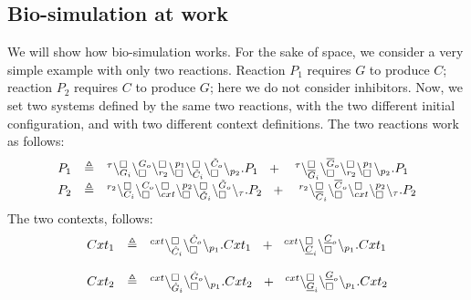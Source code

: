 \subsection{Bio-simulation at work}

We will show how bio-simulation works. For the sake of space, we consider a  very simple
 example with only two reactions. 
Reaction $P_1$ requires $G$  to produce $C$; reaction $P_2$
requires $C$ to produce $G$; here we do not consider inhibitors.  
Now, we set two systems defined by the same two reactions, with the two different initial configuration, and with two different context definitions.
The two reactions work as follows:
\[
\begin{array}{lcl}
P_1 & \defeq &\startchain{\silent}\chainedlink{G_i}{\noact}\chainedlink{\noact}{G_o}
					        \chainedlink{r_{2}}{\noact}\chainedlink{\noact}{p_1}
					        \chainedlink{\tilde{C}_i}{\noact}\chainedlink{\noact}{\tilde{C}_o}
			\chainend{p_{2}}.P_1  \   \
			 +\ 
					\ \  \startchain{\silent}\chainedlink{\overline{G}_i}{\noact}\chainedlink{\noact}{\overline{G}_o}\chainedlink{r_{2}}{\noact}\chainedlink{\noact}{p_1} \chainend{p_{2}}.P_1\\
					P_2 & \defeq &\startchain{r_2}\chainedlink{C_i}{\noact}\chainedlink{\noact}{C_o}
					        \chainedlink{cxt}{\noact}\chainedlink{\noact}{p_2}
					        \chainedlink{\tilde{G}_i}{\noact}\chainedlink{\noact}{\tilde{G}_o}
			\chainend{\silent}.P_2  \   \
			 +\ 
					\ \  \startchain{r_2}\chainedlink{\overline{C}_i}{\noact}\chainedlink{\noact}{\overline{C}_o}\chainedlink{cxt}{\noact}\chainedlink{\noact}{p_2} \chainend{\silent}.P_2
			\end{array}
\]
The two contexts,  follows:\\
\[
\begin{array}{lcl}
Cxt_1 & \triangleq &{}^{cxt}\backslash_{\hat{C}_i}^{\scriptstyle {\square}}\backslash_{\scriptstyle {\square}}^{\hat{C}_o}\backslash_{p_1}.Cxt_1 \ \ 			                      +\ \  
                              {}^{cxt}\backslash_{\underline{C}_i}^{\scriptstyle {\square}}\backslash_{\scriptstyle {\square}}^{\underline{C}_o}\backslash_{p_1}.Cxt_1 \\
                              \\
                              Cxt_2 & \triangleq &{}^{cxt}\backslash_{\hat{G}_i}^{\scriptstyle {\square}}\backslash_{\scriptstyle {\square}}^{\hat{G}_o}\backslash_{p_1}.Cxt_2 \ \ 			                      +\ \  
                              {}^{cxt}\backslash_{\underline{G}_i}^{\scriptstyle {\square}}\backslash_{\scriptstyle {\square}}^{\underline{G}_o}\backslash_{p_1}.Cxt_2
\end{array}
\]

